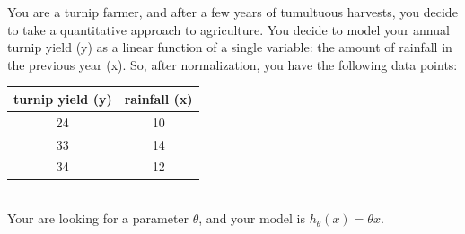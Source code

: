 \documentclass[a4paper]{article}
\begin{document}
    \noindent You are a turnip farmer, and after a few years of tumultuous harvests, you decide to take a quantitative approach to agriculture. You decide to model your annual turnip yield (y) as a linear function of a single variable: the amount of rainfall in the previous year (x). So, after normalization, you have the following data points:
    \begin{table}[ht]
    	\center
    	\begin{tabular}{|c|c|}
    	\hline
    	turnip yield (y) & rainfall (x) \\
    	\hline
    	24 & 10 \\
    	\hline
    	33 & 14 \\
    	\hline
    	34 & 12 \\
    	\hline
    	\end{tabular}
    \end{table} \\
    Your are looking for a parameter $\theta$, and your model is $h_{\theta}(x) = \theta x$.
\end{document}
